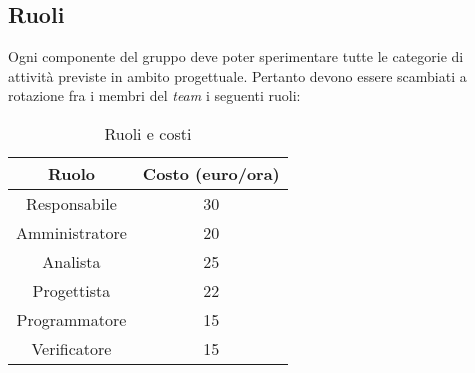 \subsection{Ruoli}
Ogni componente del gruppo deve poter sperimentare tutte le categorie di attività previste in ambito progettuale. Pertanto devono essere scambiati a rotazione fra i membri del \textit{team} i seguenti ruoli:
\begin{table}[h]
\centering
\bgroup
\def\arraystretch{1.6}
\begin{tabular}{| c | c |}
\hline
\textbf{Ruolo} & \textbf{Costo (euro/ora)}\\ \hline \hline
Responsabile & 30  \\ \hline 
Amministratore & 20  \\ \hline 
Analista & 25  \\ \hline 
Progettista & 22  \\ \hline 
Programmatore & 15  \\ \hline
Verificatore & 15  \\ \hline  
\end{tabular}
\egroup
\caption{Ruoli e costi}
\end{table}

\newpage